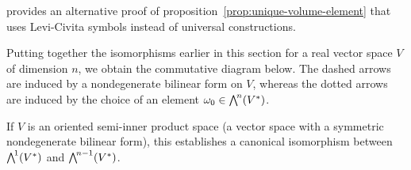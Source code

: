 \parencite[p.~218]{szekeres2004} provides an alternative proof
of proposition~\ref{prop:unique-volume-element} that uses Levi-Civita symbols
instead of universal constructions.

Putting together the isomorphisms earlier in this section
for a real vector space $V$ of dimension $n$,
we obtain the commutative diagram below.
The dashed arrows are induced by a nondegenerate bilinear form on $V\!$,
whereas the dotted arrows are induced by the choice of an element $\omega_0 \in {\textstyle\bigwedge\nolimits^{\!{n}}}(V^*)$.

\begin{center}
\end{center}

If $V$ is an oriented semi-inner product space
(a vector space with a symmetric nondegenerate bilinear form),
this establishes a canonical isomorphism between ${\textstyle\bigwedge\nolimits^{\!{1}}}(V^*)$ and ${\textstyle\bigwedge\nolimits^{\!{n-1}}}(V^*)$.

